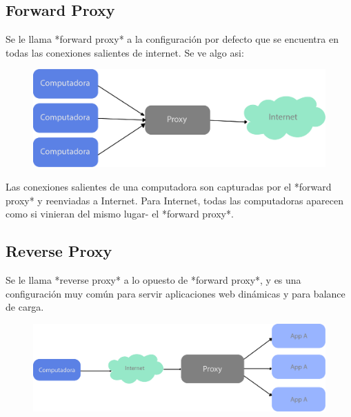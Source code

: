 \subsection[Forward Proxy]{Forward Proxy}

Se le llama *forward proxy* a la configuración por defecto que se encuentra en todas las conexiones salientes de internet. Se ve algo asi:

\begin{figure}[h!]
  \centering
    \includegraphics[scale=0.7]{images/forward-proxy.png}
  \label{fig:forwardproxy}
\end{figure}

Las conexiones salientes de una computadora son capturadas por el *forward proxy* y reenviadas a Internet. Para Internet, todas las computadoras aparecen como si vinieran del mismo lugar- el *forward proxy*.


\subsection[Reverse Proxy]{Reverse Proxy}

Se le llama *reverse proxy* a lo opuesto de *forward proxy*, y es una configuración muy común para servir aplicaciones web dinámicas y para balance de carga.

\begin{figure}[h!]
  \centering
    \includegraphics[scale=0.7]{images/reverse-proxy.png}
  \label{fig:reverseproxy}
\end{figure}

